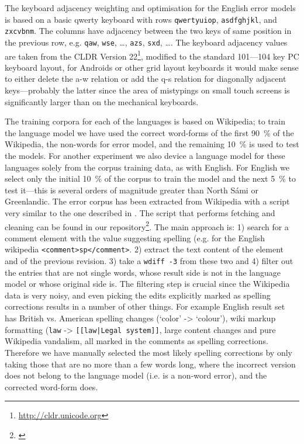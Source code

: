 \documentclass[a4paper,12pt]{article}
\begin{document}
The keyboard adjacency weighting and optimisation for the English error models
is based on a basic qwerty keyboard with rows \texttt{qwertyuiop},
\texttt{asdfghjkl}, and \texttt{zxcvbnm}. The columns have adjacency between
the two keys of same position in the previous row, e.g. \texttt{qaw},
\texttt{wse}, \ldots, \texttt{azs}, \texttt{sxd}, \ldots.  The keyboard
adjacency values are taken from the CLDR Version
22\footnote{\url{http://cldr.unicode.org}}, modified to the standard 101---104
key PC keyboard layout, for Androids or other grid layout keyboards it would
make sense to either delete the a-w relation or add the q-s relation for
diagonally adjacent keys---probably the latter since the area of mistypings on
small touch screens is significantly larger than on the mechanical keyboards.

The training corpora for each of the languages is based on Wikipedia; to train
the language model we have used the correct word-forms of the first 90~\% of
the Wikipedia, the non-words for error model, and the remaining 10~\% is used
to test the models. For another experiment we also device a language model for
these languages solely from the corpus training data, as with English.  For
English we select only the initial 10~\% of the corpus to train the model and
the next 5~\% to test it---this is several orders of magnitude greater than
North Sámi or Greenlandic. The error corpus has been extracted from Wikipedia
with a script very similar to the one described in \cite{max2010mining}. The
script that performs fetching and cleaning can be found in our
repository\footnote{\url{}}. The main approach is: 1) search for a comment
element with the value suggesting spelling (e.g. for the English wikipedia
\texttt{<comment>sp</comment>}. 2) extract the text content of the element and
of the previous revision. 3) take a \texttt{wdiff -3} from these two and 4)
filter out the entries that are not single words, whose result side is not in
the language model or whose original side is.  The filtering step is crucial
since the Wikipedia data is very noisy, and even picking the edits explicitly
marked as spelling corrections results in a number of other things. For example
English result set has British vs.  American spelling changes (`color' ->
`colour'), wiki markup formatting (\texttt{law} -> \texttt{[[law|Legal
system]]}, large content changes and pure Wikipedia vandalism, all marked in
the comments as spelling corrections. Therefore we have manually selected the
most likely spelling corrections by only taking those that are no more than a
few words long, where the incorrect version does not belong to the language
model (i.e.  is a non-word error), and the corrected word-form does.
\end{document}
